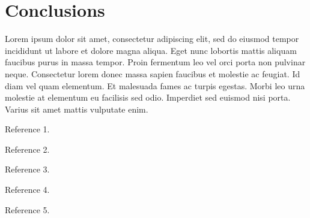 \documentclass[runningheads]{llncs}
\begin{document}
\section{Conclusions}

Lorem ipsum dolor sit amet, consectetur adipiscing elit, sed do eiusmod tempor incididunt ut labore et dolore magna aliqua. Eget nunc lobortis mattis aliquam faucibus purus in massa tempor. Proin fermentum leo vel orci porta non pulvinar neque. Consectetur lorem donec massa sapien faucibus et molestie ac feugiat. Id diam vel quam elementum. Et malesuada fames ac turpis egestas. Morbi leo urna molestie at elementum eu facilisis sed odio. Imperdiet sed euismod nisi porta. Varius sit amet mattis vulputate enim.





 



%
%
%
% 
% 
%
\begin{thebibliography}{8}

 Reference 1.

 Reference 2.

 Reference 3.

 Reference 4.

 Reference 5.

\end{thebibliography}
\end{document}
